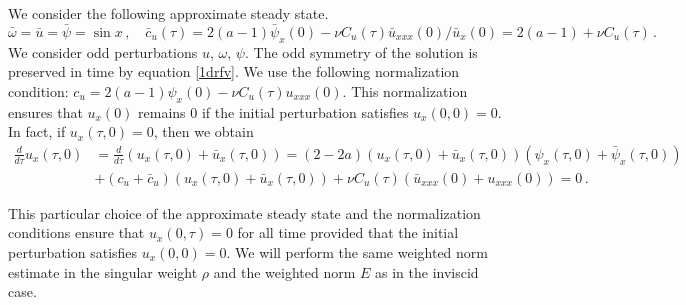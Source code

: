 \documentclass[12pt]{caltech_thesis}
\numberwithin{equation}{section}
\begin{document}
We consider the following approximate steady state.
$$\bar{\omega}=\bar{u}=\bar{\psi}=\sin x\,,\quad \bar{c}_u(\tau)=2(a-1)\bar{\psi}_x(0)-\nu C_u(\tau)\bar{u}_{xxx}(0)/\bar{u}_{x}(0)=2(a-1)+\nu C_u(\tau)\,.$$
We consider odd perturbations $u$, $\omega$, $\psi$. The odd symmetry of the solution is preserved in time by equation \eqref{1drfv}.  We use the following normalization condition: $c_u=2(a-1){\psi}_x(0)-\nu C_u(\tau)u_{xxx}(0)$. This normalization ensures that $u_x(0)$ remains $0$ if the initial perturbation satisfies $u_x(0,0)=0$. In fact, if  $u_x(\tau,0)=0$, then we obtain
$$\begin{aligned}
    \frac{d}{d\tau}u_x(\tau,0)&=\frac{d}{d\tau}(u_x(\tau,0)+\bar{u}_x(\tau,0))=(2-2a)(u_x(\tau,0)+\bar{u}_x(\tau,0))(\psi_x(\tau,0)+\bar{\psi}_x(\tau,0))\\&+(c_u+\bar{c}_u)(u_x(\tau,0)+\bar{u}_x(\tau,0))+\nu C_u(\tau)(\bar{u}_{xxx}(0)+{u}_{xxx}(0))=0\,.\end{aligned}$$

This particular choice of the approximate steady state and the normalization conditions ensure that $u_x(0,\tau)=0$ for all time provided that the initial perturbation satisfies $u_x(0,0)=0$. We will perform the same weighted norm estimate in the singular weight $\rho$ and the weighted norm $E$ as in the inviscid case. 
 
\end{document}
